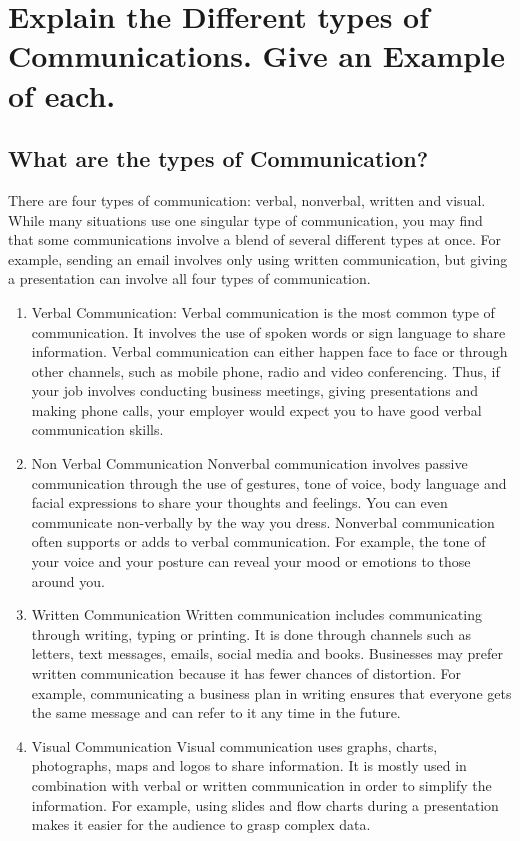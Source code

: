 \documentclass[11pt]{article}
\begin{document}
\tableofcontents
\clearpage

\section{Explain the Different types of Communications. Give an Example of each.}	

\subsection{What are the types of Communication? }
There are four types of communication: verbal, nonverbal, written and visual. While many situations use one singular type of communication, you may find that some communications involve a blend of several different types at once. For example, sending an email involves only using written communication, but giving a presentation can involve all four types of communication.
\begin{enumerate}
	\item Verbal Communication:
		Verbal communication is the most common type of communication. It involves the use of spoken words or sign language to share information. Verbal communication can either happen face to face or through other channels, such as mobile phone, radio and video conferencing. Thus, if your job involves conducting business meetings, giving presentations and making phone calls, your employer would expect you to have good verbal communication skills.	
	\item Non Verbal Communication
		Nonverbal communication involves passive communication through the use of gestures, tone of voice, body language and facial expressions to share your thoughts and feelings. You can even communicate non-verbally by the way you dress. Nonverbal communication often supports or adds to verbal communication. For example, the tone of your voice and your posture can reveal your mood or emotions to those around you.
	\item Written Communication
		Written communication includes communicating through writing, typing or printing. It is done through channels such as letters, text messages, emails, social media and books. Businesses may prefer written communication because it has fewer chances of distortion. For example, communicating a business plan in writing ensures that everyone gets the same message and can refer to it any time in the future.
	\item Visual Communication
		Visual communication uses graphs, charts, photographs, maps and logos to share information. It is mostly used in combination with verbal or written communication in order to simplify the information. For example, using slides and flow charts during a presentation makes it easier for the audience to grasp complex data.
\end{enumerate}
\end{document}
